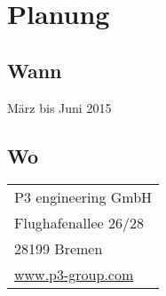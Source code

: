 \documentclass[german,a4paper,12pt,parskip=half]{scrartcl}
\begin{document}
\section{Planung}
\label{sec:planung}

  \subsection{Wann}
  \label{ssec:wann}
    März bis Juni 2015

  \subsection{Wo}
  \label{ssec:wo}
    \begin{tabular}{l}
      P3 engineering GmbH\\
      Flughafenallee 26/28\\
      28199 Bremen\\
      \href{www.p3-group.com}{www.p3-group.com}\\
    \end{tabular}

\end{document}
